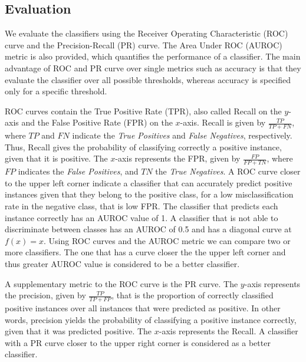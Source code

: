 \documentclass{acm_proc_article-sp}
\begin{document}
\subsection{Evaluation}
We evaluate the classifiers using the Receiver Operating Characteristic (ROC) curve and the Precision-Recall (PR) curve. The Area Under ROC (AUROC) metric is also provided, which quantifies the performance of a classifier. The main advantage of ROC and PR curve over single metrics such as accuracy is that they evaluate the classifier over all possible thresholds, whereas accuracy is specified only for a specific threshold. 

ROC curves contain the True Positive Rate (TPR), also called Recall on the $y$-axis and the False Positive Rate (FPR) on the $x$-axis. Recall is given by $\frac{TP}{TP + FN}$, where $TP$ and $FN$ indicate the \textit{True Positives} and \textit{False Negatives}, respectively. Thus, Recall gives the probability of classifying correctly a positive instance, given that it is positive. The $x$-axis represents the FPR, given by $\frac{FP}{FP + TN}$, where $FP$ indicates the \textit{False Positives}, and $TN$ the \textit{True Negatives}. A ROC curve closer to the upper left corner indicate a classifier that can accurately predict positive instances given that they belong to the positive class, for a low misclassification rate in the negative class, that is low FPR. The classifier that predicts each instance correctly has an AUROC value of 1. A classifier that is not able to discriminate between classes has an AUROC of 0.5 and has a diagonal curve at $f(x) = x$. Using ROC curves and the AUROC metric we can compare two or more classifiers. The one that has a curve closer the the upper left corner and thus greater AUROC value is considered to be a better classifier.

A supplementary metric to the ROC curve is the PR curve. The $y$-axis represents the precision, given by $\frac{TP}{TP + FP}$, that is the proportion of correctly classified positive instances over all instances that were predicted as positive. In other words, precision yields the probability of classifying a positive instance correctly, given that it was predicted positive. The $x$-axis represents the Recall. A classifier with a PR curve closer to the upper right corner is considered as a better classifier. 
\end{document}
